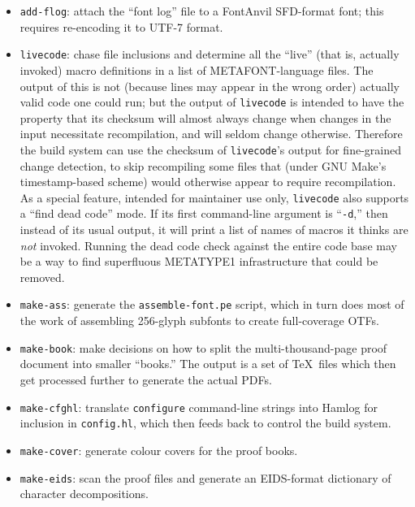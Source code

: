 \documentclass[14pt]{extarticle}
\begin{document}
\begin{itemize}

\item \texttt{add-flog}: attach the ``font log'' file to a FontAnvil
SFD-format font; this requires re-encoding it to UTF-7 format.

\item \texttt{livecode}: chase file inclusions and determine all the
``live'' (that is, actually invoked) macro definitions in a list of
METAFONT-language files.  The output of this is not (because lines may
appear in the wrong order) actually valid code one could run; but the output
of \texttt{livecode} is intended to have the property that its checksum will
almost always change when changes in the input necessitate recompilation,
and will seldom change otherwise.  Therefore the build system can use the
checksum of \texttt{livecode}'s output for fine-grained change detection, to
skip recompiling some files that (under GNU Make's timestamp-based scheme)
would otherwise appear to require recompilation.  As a special feature,
intended for maintainer use only, \texttt{livecode} also supports a ``find
dead code'' mode.  If its first command-line argument is ``\texttt{-d},''
then instead of its usual output, it will print a list of names of macros it
thinks are \emph{not} invoked.  Running the dead code check against the
entire code base may be a way to find superfluous METATYPE1 infrastructure
that could be removed.

\item \texttt{make-ass}: generate the \texttt{assemble-font.pe} script,
which in turn does most of the work of assembling 256-glyph subfonts to
create full-coverage OTFs.

\item \texttt{make-book}: make decisions on how to split the
multi-thousand-page proof document into smaller ``books.''  The output
is a set of \TeX\ files which then get processed further to generate the
actual PDFs.

\item \texttt{make-cfghl}: translate \texttt{configure} command-line strings
into Hamlog for inclusion in \texttt{config.hl}, which then feeds back to
control the build system.

\item \texttt{make-cover}: generate colour covers for the proof books.

\item \texttt{make-eids}: scan the proof files
and generate an EIDS-format dictionary of character decompositions.


\end{itemize}
\end{document}
